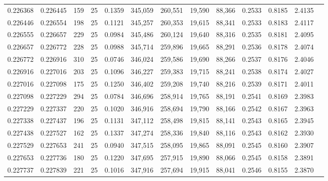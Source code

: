 \begin{tabular}{rrrrrrrrrrrrr}
0.226368 & 0.226445 &   159 &  25 &                                     0.1359 & 345,059 & 260,551 &  19,590 &  88,366 & 0.2533 & 0.8185 & 2.4135 \\
0.226446 & 0.226554 &   198 &  25 &                                     0.1121 & 345,257 & 260,353 &  19,615 &  88,341 & 0.2533 & 0.8183 & 2.4117 \\
0.226555 & 0.226657 &   229 &  25 &                                     0.0984 & 345,486 & 260,124 &  19,640 &  88,316 & 0.2535 & 0.8181 & 2.4095 \\
0.226657 & 0.226772 &   228 &  25 &                                     0.0988 & 345,714 & 259,896 &  19,665 &  88,291 & 0.2536 & 0.8178 & 2.4074 \\
0.226772 & 0.226916 &   310 &  25 &                                     0.0746 & 346,024 & 259,586 &  19,690 &  88,266 & 0.2537 & 0.8176 & 2.4046 \\
0.226916 & 0.227016 &   203 &  25 &                                     0.1096 & 346,227 & 259,383 &  19,715 &  88,241 & 0.2538 & 0.8174 & 2.4027 \\
0.227016 & 0.227098 &   175 &  25 &                                     0.1250 & 346,402 & 259,208 &  19,740 &  88,216 & 0.2539 & 0.8171 & 2.4011 \\
0.227098 & 0.227229 &   294 &  25 &                                     0.0784 & 346,696 & 258,914 &  19,765 &  88,191 & 0.2541 & 0.8169 & 2.3983 \\
0.227229 & 0.227337 &   220 &  25 &                                     0.1020 & 346,916 & 258,694 &  19,790 &  88,166 & 0.2542 & 0.8167 & 2.3963 \\
0.227338 & 0.227437 &   196 &  25 &                                     0.1131 & 347,112 & 258,498 &  19,815 &  88,141 & 0.2543 & 0.8165 & 2.3945 \\
0.227438 & 0.227527 &   162 &  25 &                                     0.1337 & 347,274 & 258,336 &  19,840 &  88,116 & 0.2543 & 0.8162 & 2.3930 \\
0.227529 & 0.227653 &   241 &  25 &                                     0.0940 & 347,515 & 258,095 &  19,865 &  88,091 & 0.2545 & 0.8160 & 2.3907 \\
0.227653 & 0.227736 &   180 &  25 &                                     0.1220 & 347,695 & 257,915 &  19,890 &  88,066 & 0.2545 & 0.8158 & 2.3891 \\
0.227737 & 0.227839 &   221 &  25 &                                     0.1016 & 347,916 & 257,694 &  19,915 &  88,041 & 0.2546 & 0.8155 & 2.3870 \\

\end{tabular}
